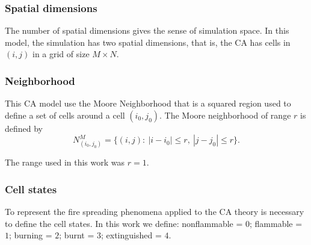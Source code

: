 \documentclass[conference]{IEEEtran}
\begin{document}
        \subsubsection{Spatial dimensions}
        
            The number of spatial dimensions gives the sense of simulation space. In this model, the simulation has 
            two spatial dimensions, that is, the CA has cells in $(i,j)$ in a grid of size $M\times N$.
            
        \subsubsection{Neighborhood}
        
            This CA model use the Moore Neighborhood \cite{moorewolfram} that is a squared region used 
            to define a set of cells around a cell $(i_0,j_0)$. The Moore neighborhood of range $r$ is defined by
            \begin{equation}
                N_{(i_0,j_0)}^M = \{(i,j): ~ |i-i_0|\leq r, ~ |j-j_0|\leq r \}.
            \end{equation}
            
            The range used in this work was $r=1$.

            
        \subsubsection{Cell states}
        
            To represent the fire spreading phenomena applied to the CA theory is necessary to define the cell states. 
            In this work we define: nonflammable = $0$; flammable = $1$; burning = $2$; burnt = $3$; extinguished = $4$.
            
            
\end{document}
